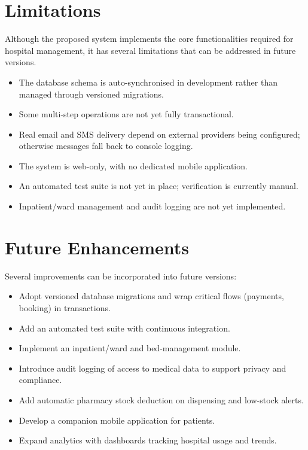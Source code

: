 \documentclass[12pt,a4paper]{report}
\begin{document}
\section{Limitations}
Although the proposed system implements the core functionalities required for hospital
management, it has several limitations that can be addressed in future versions.
\begin{itemize}[leftmargin=1.4em]
  \item The database schema is auto-synchronised in development rather than managed
        through versioned migrations.
  \item Some multi-step operations are not yet fully transactional.
  \item Real email and SMS delivery depend on external providers being configured;
        otherwise messages fall back to console logging.
  \item The system is web-only, with no dedicated mobile application.
  \item An automated test suite is not yet in place; verification is currently manual.
  \item Inpatient/ward management and audit logging are not yet implemented.
\end{itemize}

\section{Future Enhancements}
Several improvements can be incorporated into future versions:
\begin{itemize}[leftmargin=1.4em]
  \item Adopt versioned database migrations and wrap critical flows (payments, booking)
        in transactions.
  \item Add an automated test suite with continuous integration.
  \item Implement an inpatient/ward and bed-management module.
  \item Introduce audit logging of access to medical data to support privacy and
        compliance.
  \item Add automatic pharmacy stock deduction on dispensing and low-stock alerts.
  \item Develop a companion mobile application for patients.
  \item Expand analytics with dashboards tracking hospital usage and trends.
\end{itemize}
\end{document}
